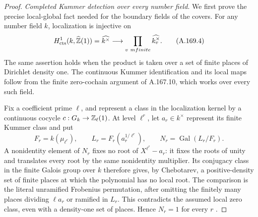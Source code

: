 \begin{proof}
\emph{Completed Kummer detection over every number field.}
We first prove the precise local-global fact needed for the boundary
fields of the covers.  For any number field \(k\), localization is
injective on
\[
 H^1_{\rm cts}(k,\widehat{\mathbb Z}(1))
        =\widehat{k^\times}
       \longrightarrow\prod_{v\ {
m finite}}
                                  \widehat{k_v^\times}.
\tag{A.169.4}
\]
The same assertion holds when the product is taken over a set of
finite places of Dirichlet density one.  The continuous Kummer
identification and its local maps follow from the finite
zero-cochain argument of A.167.10, which works over every such field.

Fix a coefficient prime \(\ell\), and represent a class in the
localization kernel by a continuous cocycle
\(c:G_k\to\mathbb Z_\ell(1)\).  At level \(\ell^r\), let
\(a_r\in k^\times\) represent its finite Kummer class and put
\[
 F_r=k(\mu_{\ell^r}),\qquad
 L_r=F_r(a_r^{1/\ell^r}),\qquad
 N_r=\operatorname{Gal}(L_r/F_r).
\tag{A.169.5}
\]
A nonidentity element of \(N_r\) fixes no root of
\(X^{\ell^r}-a_r\): it fixes the roots of unity and translates
every root by the same nonidentity multiplier.  Its conjugacy class
in the finite Galois group over \(k\) therefore gives, by
Chebotarev, a positive-density set of finite places at which the
polynomial has no local root.  The comparison is the literal
unramified Frobenius permutation, after omitting the finitely many
places dividing \(\ell a_r\) or ramified in \(L_r\).
This contradicts the assumed local zero class, even with a
density-one set of places.  Hence \(N_r=1\) for every \(r\)
\cite[Theorem 8.31]{AgentMilneANT}.


\end{proof}
